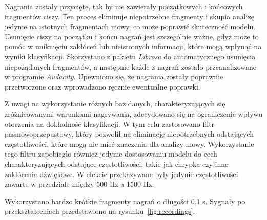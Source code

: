 Nagrania zostały przycięte, tak by nie zawierały początkowych i końcowych fragmentów ciszy.
Ten proces eliminuje niepotrzebne fragmenty i skupia analizę jedynie na istotnych fragmentach mowy, co może poprawić skuteczność modelu.
Usunięcie ciszy na początku i końcu nagrań jest szczególnie ważne, gdyż może to pomóc w uniknięciu zakłóceń lub nieistotnych informacji, które mogą wpłynąć na wyniki klasyfikacji.
Skorzystano z pakietu \emph{Librosa} do automatycznego usunięcia niepożądanych fragmentów, a następnie każde z nagrań zostało przeanalizowane w programie \emph{Audacity}.
Upewniono się, że nagrania zostały poprawnie przetworzone oraz wprowadzono ręcznie ewentualne poprawki.

Z uwagi na wykorzystanie różnych baz danych, charakteryzujących się zróżnicowanymi warunkami nagrywania, zdecydowano się na ograniczenie wpływu otoczenia na dokładność klasyfikacji.
W tym celu zastosowano filtr pasmowoprzepustowy, który pozwolił na eliminację niepotrzebnych odstających częstotliwości, które mogą nie mieć znaczenia dla analizy mowy.
Wykorzystanie tego filtru zapobiegło również jedynie dostosowaniu modelu do cech charakteryzujących odstające częstotliwości, takie jak chrypka czy inne zakłócenia dźwiękowe.
W efekcie przekazywane były jedynie częstotliwości zawarte w przedziale między 500 Hz a 1500 Hz.

Wykorzystano bardzo krótkie fragmenty nagrań o długości 0,1 s.
Sygnały po przekształceniach przedstawiono na rysunku~\ref{fig:recordings}.

